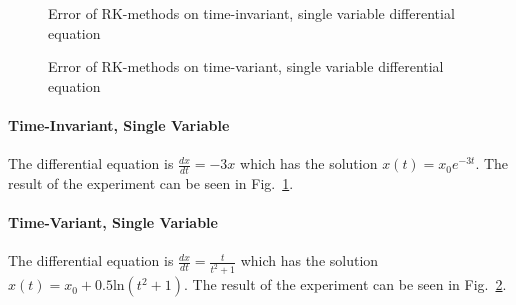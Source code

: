 \begin{figure}[!h]
    \caption{Error of RK-methods on time-invariant, single variable differential equation}
    \label{fig:RK_error_y'=-3y}
\end{figure}
\begin{figure}[!h]
    \caption{Error of RK-methods on time-variant, single variable differential equation}
    \label{fig:RK_error_y'=tdiv(t_t+1)}
\end{figure}

\paragraph*{Time-Invariant, Single Variable}
The differential equation is $\frac{dx}{dt}=-3x$ which has the solution $x(t)=x_0e^{-3t}$.
The result of the experiment can be seen in Fig.~\ref{fig:RK_error_y'=-3y}.

\paragraph*{Time-Variant, Single Variable}
The differential equation is $\frac{dx}{dt}=\frac{t}{t^2+1}$ which has the solution $x(t)=x_0 + 0.5\text{ln}(t^2+1)$.
The result of the experiment can be seen in Fig.~\ref{fig:RK_error_y'=tdiv(t_t+1)}.

